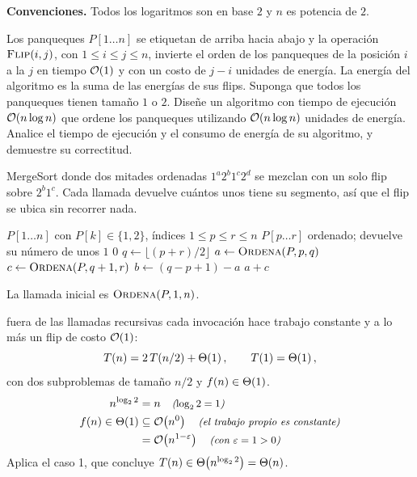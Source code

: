 \documentclass[11pt,letterpaper]{article}
\begin{document}

\noindent\textbf{Convenciones.}
Todos los logaritmos son en base $2$ y $n$ es potencia de $2$.

\noindent Los panqueques $P[1 \ldots n]$ se etiquetan de arriba hacia
abajo y la operación $\textsc{Flip}(i, j)$, con $1 \le i \le j \le n$,
invierte el orden de los panqueques de la posición $i$ a la $j$ en
tiempo $\mathcal{O}\!\left(1\right)$ y con un costo de $j - i$ unidades de energía. La
energía del algoritmo es la suma de las energías de sus flips.
Suponga que todos los panqueques tienen tamaño $1$ o $2$. Diseñe un
algoritmo con tiempo de ejecución $\mathcal{O}\!\left(n \log n\right)$ que ordene los
panqueques utilizando $\mathcal{O}\!\left(n \log n\right)$ unidades de energía. Analice el
tiempo de ejecución y el consumo de energía de su algoritmo, y
demuestre su correctitud.

 MergeSort donde dos mitades ordenadas
$1^{a} 2^{b} 1^{c} 2^{d}$ se mezclan con un solo flip sobre
$2^{b} 1^{c}$. Cada llamada devuelve cuántos unos tiene su segmento,
así que el flip se ubica sin recorrer nada.

\begin{algorithm}[H]
  \caption{Ordena una pila de panqueques de tamaño $1$ o $2$}
  \label{ej13:ej13-alg-ordena}
  \begin{algorithmic}[1]
    \Require $P[1 \ldots n]$ con $P[k] \in \{1, 2\}$, índices
             $1 \le p \le r \le n$
    \Ensure $P[p \ldots r]$ ordenado; devuelve su número de unos
          \State \Return $1$
        \Else
          \State \Return $0$
        \EndIf
      \EndIf
      \State $q \gets \lfloor (p + r) / 2 \rfloor$
      \State $a \gets \Call{Ordena}{P, p, q}$
      \State $c \gets \Call{Ordena}{P, q + 1, r}$
      \State $b \gets (q - p + 1) - a$
        \State {}
      \EndIf
      \State \Return $a + c$
    \EndFunction
  \end{algorithmic}
\end{algorithm}

\noindent La llamada inicial es $\textsc{Ordena}(P, 1, n)$.

 fuera de las llamadas recursivas cada
invocación hace trabajo constante y a lo más un flip de costo
$\mathcal{O}\!\left(1\right)$:
\[
  T(n) = 2\,T(n/2) + \Theta\!\left(1\right), \qquad T(1) = \Theta\!\left(1\right),
\]
con dos subproblemas de tamaño $n/2$ y $f(n) \in \Theta\!\left(1\right)$.
\begin{align*}
  n^{\log_2 2} &= n \quad\text{\small\itshape ($\log_2 2 = 1$)} \\
  f(n) \in \Theta\!\left(1\right) &\subseteq \mathcal{O}\!\left(n^{0}\right)
          \quad\text{\small\itshape (el trabajo propio es constante)} \\
          &= \mathcal{O}\!\left(n^{1 - \varepsilon}\right)
          \quad\text{\small\itshape (con $\varepsilon = 1 > 0$)}
\end{align*}
Aplica el caso 1, que concluye
$T(n) \in \Theta\!\left(n^{\log_2 2}\right) = \Theta\!\left(n\right)$.
\end{document}
